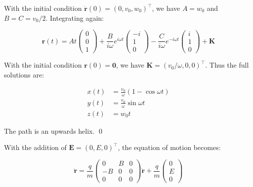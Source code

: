 \documentclass[12pt]{article}
\begin{document}
With the initial condition $\dot{\mathbf{r}}(0) = (0, v_{0}, w_{0})^{\intercal}$, we have $A = w_{0}$ and $B = C = v_{0}/2$. Integrating again:

\begin{equation}
    \mathbf{r}(t) = 
    At
    \begin{pmatrix}
        0 \\
        0 \\
        1
    \end{pmatrix}
    +
    \frac{B}{i\omega} e^{i\omega t}
    \begin{pmatrix}
        -i \\
        1 \\
        0
    \end{pmatrix}
    -
    \frac{C}{i\omega} e^{-i\omega t}
    \begin{pmatrix}
        i \\
        1 \\
        0
    \end{pmatrix}
    +
    \mathbf{K}
\end{equation}

With the initial condition $\mathbf{r}(0) = \mathbf{0}$, we have $\mathbf{K} = (v_{0}/\omega, 0, 0)^{\intercal}$. Thus the full solutions are:

\begin{equation}
\begin{split}
    x(t) &= \frac{v_{0}}{\omega} (1 - \cos{\omega t}) \\
    y(t) &= \frac{v_{0}}{\omega} \sin{\omega t} \\
    z(t) &= w_{0} t
\end{split}
\end{equation}

The path is an upwards helix.
\qed


With the addition of $\mathbf{E} = (0, E, 0)^{\intercal}$, the equation of motion becomes:

\begin{equation}
    \ddot{\mathbf{r}}
    =
    \frac{q}{m}
    \begin{pmatrix}
        0 & B & 0 \\
        -B & 0 & 0 \\
        0 & 0 & 0
    \end{pmatrix}
    \dot{\mathbf{r}}
    +
    \frac{q}{m}
    \begin{pmatrix}
        0 \\
        E \\
        0
    \end{pmatrix}
\end{equation}
\end{document}
